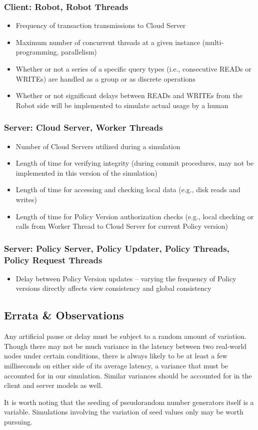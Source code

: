 \documentclass[11pt]{article}
\begin{document}
\subsubsection{Client: Robot, Robot Threads}
\begin{itemize}
\item{}Frequency of transaction transmissions to Cloud Server
\item{}Maximum number of concurrent threads at a given instance (multi-programming, parallelism)
\item{}Whether or not a series of a specific query types (i.e., consecutive READs or WRITEs) are handled as a group or as discrete operations
\item{}Whether or not significant delays between READs and WRITEs from the Robot side will be implemented to simulate actual usage by a human
\end{itemize}
\subsubsection{Server: Cloud Server, Worker Threads}
\begin{itemize}
\item{}Number of Cloud Servers utilized during a simulation
\item{}Length of time for verifying integrity (during commit procedures, may not be implemented in this version of the simulation)
\item{}Length of time for accessing and checking local data (e.g., disk reads and writes)
\item{}Length of time for Policy Version authorization checks (e.g., local checking or calls from Worker Thread to Cloud Server for current Policy version)
\end{itemize}
\subsubsection{Server: Policy Server, Policy Updater, Policy Threads, Policy Request Threads}
\begin{itemize}
\item{}Delay between Policy Version updates -- varying the frequency of Policy versions directly affects view consistency and global consistency
\end{itemize}
\subsection{Errata \& Observations}
Any artificial pause or delay must be subject to a random amount of variation. Though there may not be much variance in the latency between two real-world nodes under certain conditions, there is always likely to be at least a few milliseconds on either side of its average latency, a variance that must be accounted for in our simulation. Similar variances should be accounted for in the client and server models as well.

It is worth noting that the seeding of pseudorandom number generators itself is a variable. Simulations involving the variation of seed values only may be worth pursuing.
\end{document}
